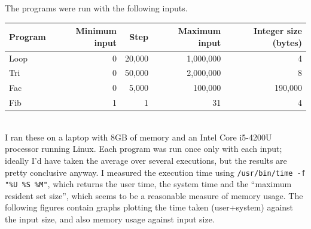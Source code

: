 \documentclass[a4paper]{article}
\begin{document}
\noindent The programs were run with the following inputs.  
\\

\begin{tabular}{|l|r|r|r|r|} 
\hline
Program   & Minimum input & Step & Maximum input & Integer size (bytes) \\
\hline
Loop & 0 & 20,000 & 1,000,000 & 4\\
Tri  & 0 & 50,000 & 2,000,000 & 8\\
Fac  & 0 & 5,000 & 100,000 & 190,000\\
Fib  & 1 & 1 & 31 & 4 \\
\hline
\end{tabular}
\\

\noindent
I ran these on a laptop with 8GB of memory and an Intel Core i5-4200U
processor running Linux.  Each program was run once only with each
input; ideally I'd have taken the average over several executions, but
the results are pretty conclusive anyway.  I measured the execution
time using \texttt{/usr/bin/time -f "\%U \%S \%M"}, 
which returns the  user time, the system time and the ``maximum resident set size'',
which seems to be a reasonable measure of memory usage.  The
following figures contain graphs plotting the time taken
(user+system) against the input size, and also memory usage
against input size.
\end{document}
